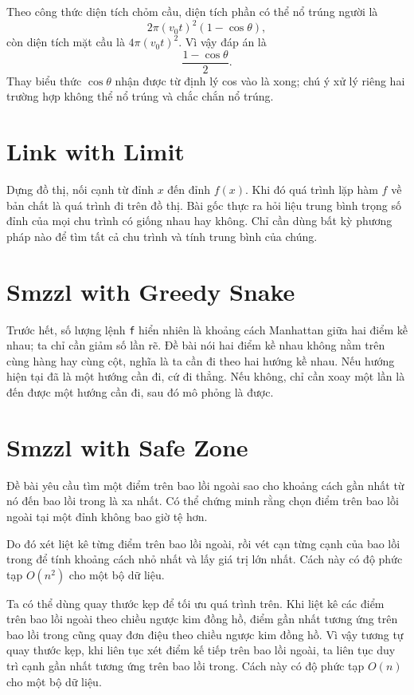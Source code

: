 \documentclass[11pt]{article}
\begin{document}
Theo công thức diện tích chỏm cầu, diện tích phần có thể nổ trúng người là
\[
  2\pi (v_0t)^2(1-\cos\theta),
\]
còn diện tích mặt cầu là $4\pi(v_0t)^2$. Vì vậy đáp án là
\[
  \frac{1-\cos\theta}{2}.
\]
Thay biểu thức $\cos\theta$ nhận được từ định lý cos vào là xong; chú ý xử lý
riêng hai trường hợp không thể nổ trúng và chắc chắn nổ trúng.

\section{Link with Limit}

Dựng đồ thị, nối cạnh từ đỉnh $x$ đến đỉnh $f(x)$. Khi đó quá trình lặp hàm
$f$ về bản chất là quá trình đi trên đồ thị. Bài gốc thực ra hỏi liệu trung
bình trọng số đỉnh của mọi chu trình có giống nhau hay không. Chỉ cần dùng bất
kỳ phương pháp nào để tìm tất cả chu trình và tính trung bình của chúng.

\section{Smzzl with Greedy Snake}

Trước hết, số lượng lệnh \texttt{f} hiển nhiên là khoảng cách Manhattan giữa
hai điểm kề nhau; ta chỉ cần giảm số lần rẽ. Đề bài nói hai điểm kề nhau không
nằm trên cùng hàng hay cùng cột, nghĩa là ta cần đi theo hai hướng kề nhau. Nếu
hướng hiện tại đã là một hướng cần đi, cứ đi thẳng. Nếu không, chỉ cần xoay một
lần là đến được một hướng cần đi, sau đó mô phỏng là được.

\section{Smzzl with Safe Zone}

Đề bài yêu cầu tìm một điểm trên bao lồi ngoài sao cho khoảng cách gần nhất từ
nó đến bao lồi trong là xa nhất. Có thể chứng minh rằng chọn điểm trên bao lồi
ngoài tại một đỉnh không bao giờ tệ hơn.

Do đó xét liệt kê từng điểm trên bao lồi ngoài, rồi vét cạn từng cạnh của bao
lồi trong để tính khoảng cách nhỏ nhất và lấy giá trị lớn nhất. Cách này có độ
phức tạp $O(n^2)$ cho một bộ dữ liệu.

Ta có thể dùng quay thước kẹp để tối ưu quá trình trên. Khi liệt kê các điểm
trên bao lồi ngoài theo chiều ngược kim đồng hồ, điểm gần nhất tương ứng trên
bao lồi trong cũng quay đơn điệu theo chiều ngược kim đồng hồ. Vì vậy tương tự
quay thước kẹp, khi liên tục xét điểm kế tiếp trên bao lồi ngoài, ta liên tục
duy trì cạnh gần nhất tương ứng trên bao lồi trong. Cách này có độ phức tạp
$O(n)$ cho một bộ dữ liệu.
\end{document}
